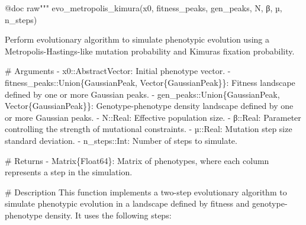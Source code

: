 \documentclass[
]{scrartcl}
\newenvironment{Shaded}{\begin{snugshade}}{\end{snugshade}}
\newcommand{\PreprocessorTok}[1]{\textcolor[rgb]{0.68,0.00,0.00}{#1}}
\newcommand{\StringTok}[1]{\textcolor[rgb]{0.13,0.47,0.30}{#1}}
\begin{document}
\begin{Shaded}
\begin{Highlighting}[]
\PreprocessorTok{@doc} \StringTok{raw"""}
\StringTok{    evo\_metropolis\_kimura(x0, fitness\_peaks, gen\_peaks, N, β, µ, n\_steps)}

\StringTok{Perform evolutionary algorithm to simulate phenotypic evolution using a}
\StringTok{Metropolis{-}Hastings{-}like mutation probability and Kimura\textquotesingle{}s fixation probability.}

\StringTok{\# Arguments}
\StringTok{{-} \textasciigrave{}x0::AbstractVector\textasciigrave{}: Initial phenotype vector.}
\StringTok{{-} \textasciigrave{}fitness\_peaks::Union\{GaussianPeak, Vector\{GaussianPeak\}\}\textasciigrave{}: Fitness landscape}
\StringTok{  defined by one or more Gaussian peaks.}
\StringTok{{-} \textasciigrave{}gen\_peaks::Union\{GaussianPeak, Vector\{GaussianPeak\}\}\textasciigrave{}: Genotype{-}phenotype}
\StringTok{  density landscape defined by one or more Gaussian peaks.}
\StringTok{{-} \textasciigrave{}N::Real\textasciigrave{}: Effective population size.}
\StringTok{{-} \textasciigrave{}β::Real\textasciigrave{}: Parameter controlling the strength of mutational constraints.}
\StringTok{{-} \textasciigrave{}µ::Real\textasciigrave{}: Mutation step size standard deviation.}
\StringTok{{-} \textasciigrave{}n\_steps::Int\textasciigrave{}: Number of steps to simulate.}

\StringTok{\# Returns}
\StringTok{{-} \textasciigrave{}Matrix\{Float64\}\textasciigrave{}: Matrix of phenotypes, where each column represents a step}
\StringTok{  in the simulation.}

\StringTok{\# Description}
\StringTok{This function implements a two{-}step evolutionary algorithm to simulate}
\StringTok{phenotypic evolution in a landscape defined by fitness and genotype{-}phenotype}
\StringTok{density. It uses the following steps:}


\end{Highlighting}
\end{Shaded}
\end{document}
